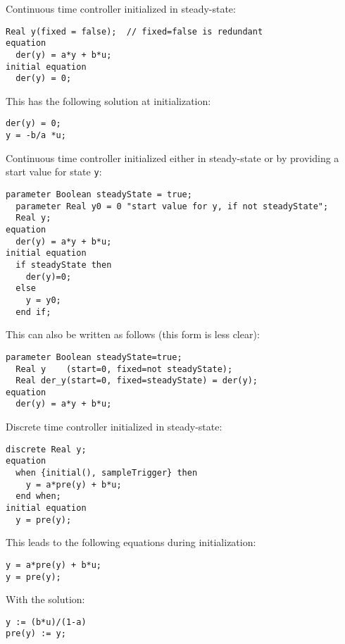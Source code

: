 \begin{example}
Continuous time controller initialized in steady-state:
\begin{lstlisting}[language=modelica]
  Real y(fixed = false);  // fixed=false is redundant
equation
  der(y) = a*y + b*u;
initial equation
  der(y) = 0;
\end{lstlisting}

This has the following solution at initialization:
\begin{lstlisting}[language=modelica]
der(y) = 0;
y = -b/a *u;
\end{lstlisting}
\end{example}

\begin{example}
Continuous time controller initialized either in steady-state or by providing a start value for state \lstinline!y!:
\begin{lstlisting}[language=modelica]
  parameter Boolean steadyState = true;
  parameter Real y0 = 0 "start value for y, if not steadyState";
  Real y;
equation
  der(y) = a*y + b*u;
initial equation
  if steadyState then
    der(y)=0;
  else
    y = y0;
  end if;
\end{lstlisting}

This can also be written as follows (this form is less clear):
\begin{lstlisting}[language=modelica]
  parameter Boolean steadyState=true;
  Real y    (start=0, fixed=not steadyState);
  Real der_y(start=0, fixed=steadyState) = der(y);
equation
  der(y) = a*y + b*u;
\end{lstlisting}
\end{example}

\begin{example}
Discrete time controller initialized in steady-state:
\begin{lstlisting}[language=modelica]
  discrete Real y;
equation
  when {initial(), sampleTrigger} then
    y = a*pre(y) + b*u;
  end when;
initial equation
  y = pre(y);
\end{lstlisting}

This leads to the following equations during initialization:
\begin{lstlisting}[language=modelica]
y = a*pre(y) + b*u;
y = pre(y);
\end{lstlisting}

With the solution:
\begin{lstlisting}[language=modelica]
y := (b*u)/(1-a)
pre(y) := y;
\end{lstlisting}
\end{example}

